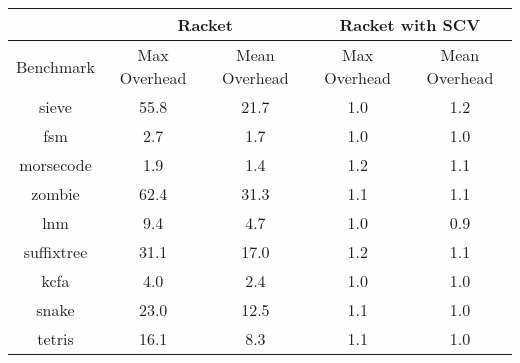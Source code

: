 \begin{tabular}{ | c | c c | c c | }
\hline
& \multicolumn{2}{|c|}{Racket}
& \multicolumn{2}{|c|}{Racket with SCV} \\
\hline
Benchmark
& Max Overhead & Mean Overhead
& Max Overhead & Mean Overhead \\
\hline
sieve & 55.8 & 21.7 & 1.0 & 1.2\\fsm & 2.7 & 1.7 & 1.0 & 1.0\\morsecode & 1.9 & 1.4 & 1.2 & 1.1\\zombie & 62.4 & 31.3 & 1.1 & 1.1\\lnm & 9.4 & 4.7 & 1.0 & 0.9\\suffixtree & 31.1 & 17.0 & 1.2 & 1.1\\kcfa & 4.0 & 2.4 & 1.0 & 1.0\\snake & 23.0 & 12.5 & 1.1 & 1.0\\tetris & 16.1 & 8.3 & 1.1 & 1.0 \\
\hline
\end{tabular}
